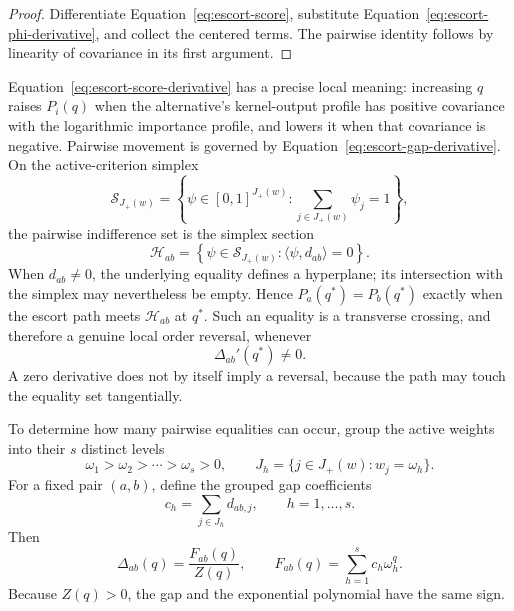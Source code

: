 \documentclass[reqno,11pt]{amsart}
\theoremstyle{definition}
\theoremstyle{plain}
\theoremstyle{remark}
\begin{document}
\begin{proof}
Differentiate Equation~\eqref{eq:escort-score}, substitute
Equation~\eqref{eq:escort-phi-derivative}, and collect the centered terms.
The pairwise identity follows by linearity of covariance in its first
argument.
\end{proof}

Equation~\eqref{eq:escort-score-derivative} has a precise local meaning:
increasing \(q\) raises \(P_i(q)\) when the alternative's kernel-output
profile has positive covariance with the logarithmic importance profile,
and lowers it when that covariance is negative. Pairwise movement is
governed by Equation~\eqref{eq:escort-gap-derivative}. On the
active-criterion simplex
\[
\mathcal S_{J_{+}(w)}
=
\left\{
\psi\in[0,1]^{J_{+}(w)}:
\sum_{j\in J_{+}(w)}\psi_j=1
\right\},
\]
the pairwise indifference set is the simplex section
\begin{equation}
\mathcal H_{ab}
=
\left\{
\psi\in\mathcal S_{J_{+}(w)}:
\langle\psi,d_{ab}\rangle=0
\right\}.
\label{eq:escort-indifference-hyperplane}
\end{equation}
When \(d_{ab}\neq0\), the underlying equality defines a hyperplane; its
intersection with the simplex may nevertheless be empty. Hence
\(P_a(q^*)=P_b(q^*)\) exactly when the escort path meets
\(\mathcal H_{ab}\) at \(q^*\). Such an equality is a transverse crossing,
and therefore a genuine local order reversal, whenever
\[
\Delta_{ab}'(q^*)\neq0.
\]
A zero derivative does not by itself imply a reversal, because the path
may touch the equality set tangentially.

To determine how many pairwise equalities can occur, group the active
weights into their \(s\) distinct levels
\[
\omega_1>\omega_2>\cdots>\omega_s>0,
\qquad
J_h=\{j\in J_{+}(w):w_j=\omega_h\}.
\]
For a fixed pair \((a,b)\), define the grouped gap coefficients
\[
c_h
=
\sum_{j\in J_h}d_{ab,j},
\qquad h=1,\ldots,s.
\]
Then
\begin{equation}
\Delta_{ab}(q)
=
\frac{F_{ab}(q)}{Z(q)},
\qquad
F_{ab}(q)
=
\sum_{h=1}^{s}c_h\omega_h^q.
\label{eq:escort-exponential-polynomial}
\end{equation}
Because \(Z(q)>0\), the gap and the exponential polynomial have the same
sign.
\end{document}
